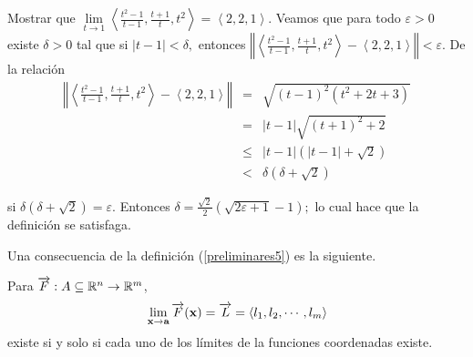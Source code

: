 \begin{parrafoitemize}
\item Mostrar que $\lim\limits_{t\rightarrow 1}\left\langle \frac{t^{2}-1}{t-1},\frac{t+1}{t},t^{2}\right\rangle =\left\langle 2,2,1\right\rangle $. Veamos que para todo $\varepsilon >0$ existe
  $\delta >0$ tal que si $\left\vert t-1\right\vert <\delta, $
  entonces $\left\Vert \left\langle \frac{t^{2}-1}{t-1},\frac{t+1}{t},t^{2}\right\rangle -\left\langle 2,2,1\right\rangle \right\Vert<\varepsilon $.
  De la relación
  \begin{eqnarray*}
    \left\Vert \left\langle \frac{t^{2}-1}{t-1},\frac{t+1}{t}%
    ,t^{2}\right\rangle -\left\langle 2,2,1\right\rangle \right\Vert  &=&
    \sqrt{\left( t-1\right) ^{2}\left( t^{2}+2t+3\right) } \\
    &=&\left\vert t-1\right\vert \sqrt{\left( t+1\right) ^{2}+2} \\
    &\leq& \left\vert t-1\right\vert \left( \left\vert t-1\right\vert +\sqrt{2}
    \right)  \\ &<& \delta \left( \delta +\sqrt{2}\right)
  \end{eqnarray*}

  si $\delta \left( \delta +\sqrt{2}\right) =\varepsilon $. Entonces
  $\delta =\frac{\sqrt{2}}{2}\left( \sqrt{2\varepsilon +1}-1\right) ;$ lo cual hace que
  la definición se satisfaga.
\end{parrafoitemize}
Una consecuencia de la definición (\ref{preliminares5}) es la siguiente.
\begin{teorema}\label{preliminares3}
  Para  $\overrightarrow{F}: A \subseteq\mathbb{R}^n \to  \mathbb{R}^m$,
  $$ \lim_{{\bf x}\to {\bf a}}\overrightarrow{F}({\bf x})=\overrightarrow{L}=\langle l_{1},l_{2},\cdots ,l_{m}\rangle $$ existe si y solo si
  cada uno de los límites de la funciones coordenadas existe.
\end{teorema}

